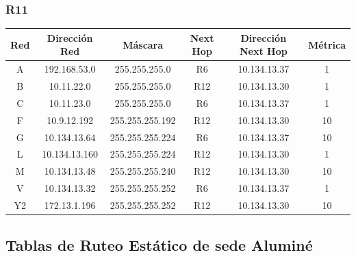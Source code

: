 \documentclass[12pt, a4paper, spanish]{article}
\begin{document}
\subsubsection{R11}
\begin{center}
\begin{tabular}{|c|c|c|c|c|c|}
	\hline
	Red & Dirección Red & Máscara & Next Hop & Dirección Next Hop & Métrica \\
	\hline
	\hline
	A & 192.168.53.0 & 255.255.255.0 & R6 & 10.134.13.37 & 1\\
	\hline
	B & 10.11.22.0 & 255.255.255.0 & R12 & 10.134.13.30 & 1\\
	\hline
	C & 10.11.23.0 & 255.255.255.0 & R6 & 10.134.13.37 & 1\\
	\hline
	F & 10.9.12.192 & 255.255.255.192 & R12 & 10.134.13.30 & 10\\
	\hline
	G & 10.134.13.64 & 255.255.255.224 & R6 & 10.134.13.37 & 10\\
	\hline
	L & 10.134.13.160 & 255.255.255.224 & R12 & 10.134.13.30 & 1\\
	\hline
	M & 10.134.13.48 & 255.255.255.240 & R12 & 10.134.13.30 & 10\\
	\hline
	V & 10.134.13.32 & 255.255.255.252 & R6 & 10.134.13.37 & 1\\
	\hline
	Y2 & 172.13.1.196 & 255.255.255.252 & R12 & 10.134.13.30 & 10\\
	\hline
\end{tabular}
\end{center}

\newpage
\subsection{Tablas de Ruteo Estático de sede Aluminé}
\end{document}
